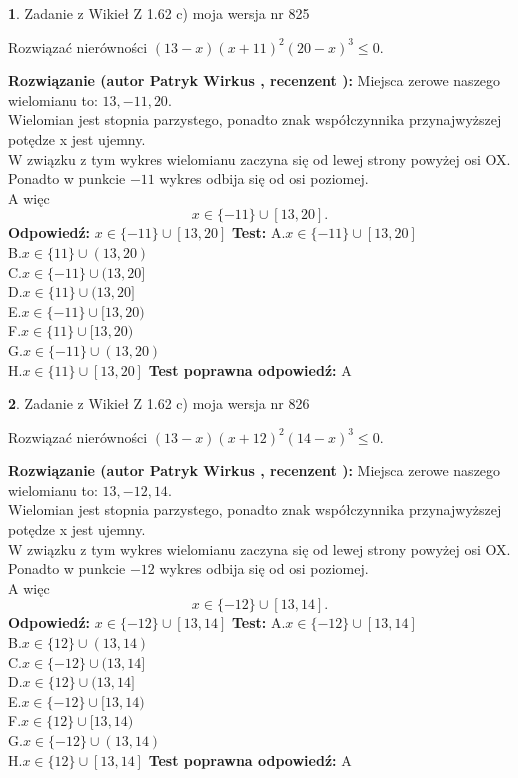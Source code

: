 \documentclass[12pt, a4paper]{article}
\theoremstyle{definition} %
\newtheorem{zad}{}
\newcommand{\zadStart}[1]{\begin{zad}#1\newline}
\newcommand{\zadStop}{\end{zad}}
\newcommand{\rozwStart}[2]{\noindent \textbf{Rozwiązanie (autor #1 , recenzent #2): }\newline}
\newcommand{\rozwStop}{\newline}
\newcommand{\odpStart}{\noindent \textbf{Odpowiedź:}\newline}
\newcommand{\odpStop}{\newline}
\newcommand{\testStart}{\noindent \textbf{Test:}\newline}
\newcommand{\testStop}{\newline}
\newcommand{\kluczStart}{\noindent \textbf{Test poprawna odpowiedź:}\newline}
\newcommand{\kluczStop}{\newline}
\begin{document}
\zadStart{Zadanie z Wikieł Z 1.62 c) moja wersja nr 825}

Rozwiązać nierówności $(13-x)(x+11)^{2}(20-x)^{3}\le0$.
\zadStop
\rozwStart{Patryk Wirkus}{}
Miejsca zerowe naszego wielomianu to: $13, -11, 20$.\\
Wielomian jest stopnia parzystego, ponadto znak współczynnika przy\linebreak najwyższej potędze x jest ujemny.\\ W związku z tym wykres wielomianu zaczyna się od lewej strony powyżej osi OX.\\
Ponadto w punkcie $-11$ wykres odbija się od osi poziomej.\\
A więc $$x \in \{-11\} \cup [13,20].$$
\rozwStop
\odpStart
$x \in \{-11\} \cup [13,20]$
\odpStop
\testStart
A.$x \in \{-11\} \cup [13,20]$\\
B.$x \in \{11\} \cup (13,20)$\\
C.$x \in \{-11\} \cup (13,20]$\\
D.$x \in \{11\} \cup (13,20]$\\
E.$x \in \{-11\} \cup [13,20)$\\
F.$x \in \{11\} \cup [13,20)$\\
G.$x \in \{-11\} \cup (13,20)$\\
H.$x \in \{11\} \cup [13,20]$
\testStop
\kluczStart
A
\kluczStop



\zadStart{Zadanie z Wikieł Z 1.62 c) moja wersja nr 826}

Rozwiązać nierówności $(13-x)(x+12)^{2}(14-x)^{3}\le0$.
\zadStop
\rozwStart{Patryk Wirkus}{}
Miejsca zerowe naszego wielomianu to: $13, -12, 14$.\\
Wielomian jest stopnia parzystego, ponadto znak współczynnika przy\linebreak najwyższej potędze x jest ujemny.\\ W związku z tym wykres wielomianu zaczyna się od lewej strony powyżej osi OX.\\
Ponadto w punkcie $-12$ wykres odbija się od osi poziomej.\\
A więc $$x \in \{-12\} \cup [13,14].$$
\rozwStop
\odpStart
$x \in \{-12\} \cup [13,14]$
\odpStop
\testStart
A.$x \in \{-12\} \cup [13,14]$\\
B.$x \in \{12\} \cup (13,14)$\\
C.$x \in \{-12\} \cup (13,14]$\\
D.$x \in \{12\} \cup (13,14]$\\
E.$x \in \{-12\} \cup [13,14)$\\
F.$x \in \{12\} \cup [13,14)$\\
G.$x \in \{-12\} \cup (13,14)$\\
H.$x \in \{12\} \cup [13,14]$
\testStop
\kluczStart
A
\kluczStop
\end{document}
